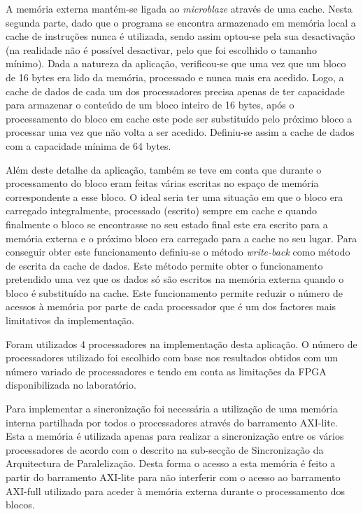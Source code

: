 A memória externa mantém-se ligada ao \textit{microblaze} através de uma cache. Nesta segunda parte, dado que o programa se encontra armazenado em memória local a cache de instruções nunca é utilizada, sendo assim optou-se pela sua desactivação (na realidade não é possível desactivar, pelo que foi escolhido o tamanho mínimo). Dada a natureza da aplicação, verificou-se que uma vez que um bloco de 16 bytes era lido da memória, processado e nunca mais era acedido. Logo, a cache de dados de cada um dos processadores precisa apenas de ter capacidade para armazenar o conteúdo de um bloco inteiro de 16 bytes, após o processamento do bloco em cache este pode ser substituído pelo próximo bloco a processar uma vez que não volta a ser acedido. Definiu-se assim a cache de dados com a capacidade mínima de 64 bytes.

Além deste detalhe da aplicação, também se teve em conta que durante o processamento do bloco eram feitas várias escritas no espaço de memória correspondente a esse bloco. O ideal seria ter uma situação em que o bloco era carregado integralmente, processado (escrito) sempre em cache e quando finalmente o bloco se encontrasse no seu estado final este era escrito para a memória externa e o próximo bloco era carregado para a cache no seu lugar. Para conseguir obter este funcionamento definiu-se o método \textit{write-back} como método de escrita da cache de dados. Este método permite obter o funcionamento pretendido uma vez que os dados só são escritos na memória externa quando o bloco é substituído na cache. Este funcionamento permite reduzir o número de acessos à memória por parte de cada processador que é um dos factores mais limitativos da implementação.

Foram utilizados 4 processadores na implementação desta aplicação. O número de processadores utilizado foi escolhido com base nos resultados obtidos com um número variado de processadores e tendo em conta as limitações da FPGA disponibilizada no laboratório.

Para implementar a sincronização foi necessária a utilização de uma memória interna partilhada por todos o processadores através do barramento AXI-lite. Esta a memória é utilizada apenas para realizar a sincronização entre os vários processadores de acordo com o descrito na sub-secção de Sincronização da Arquitectura de Paralelização. Desta forma o acesso a esta memória é feito a partir do barramento AXI-lite para não interferir com o acesso ao barramento AXI-full utilizado para aceder à memória externa durante o processamento dos blocos.

